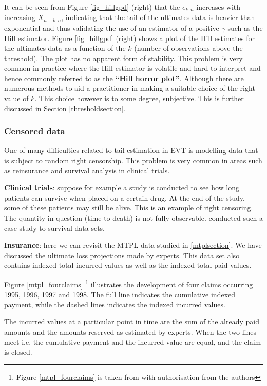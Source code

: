 It can be seen from Figure \ref{fig_hillgpd} (right) that the $e_{k,n}$ increases with increasing $X_{n-k,n}$, indicating that the tail of the ultimates data is heavier than exponential and thus validating the use of an estimator of a positive $\gamma$ such as the Hill estimator. Figure \ref{fig_hillgpd} (right) shows a plot of the Hill estimates for the ultimates data as a function of the $k$ (number of observations above the threshold). The plot has no apparent form of stability. This problem is very common in practice where the Hill estimator is volatile and hard to interpret and hence commonly referred to as the \textbf{``Hill horror plot''}. Although there are numerous methods to aid a practitioner in making a suitable choice of the right value of $k$. This choice however is to some degree, subjective. This is further discussed in Section {\ref{thresholdsection}}.

\subsubsection*{Censored data}
One of many difficulties related to tail estimation in EVT is modelling data that is subject to random right censorship. This problem is very common in areas such as reinsurance and survival analysis in clinical trials. 

\textbf{Clinical trials}: suppose for example a study is conducted to see how long patients can survive when placed on a certain drug. At the end of the study, some of these patients may still be alive. This is an example of right censoring. The quantity in question (time to death) is not fully observable. \cite{gomes2011estimation} conducted such a case study to survival data sets.

\textbf{Insurance}: here we can revisit the MTPL data studied in \autoref{mtplsection}. We have discussed the ultimate loss projections made by experts. This data set also contains indexed total incurred values as well as the indexed total paid values.

Figure \ref{mtpl_fourclaims} \footnote{Figure \ref{mtpl_fourclaims} is taken from \cite{albrecher2017reinsurance} with authorisation from the authors} illustrates the development of four claims occurring 1995, 1996, 1997 and 1998. The full line indicates the cumulative indexed payment, while the dashed lines indicates the indexed incurred values. 

The incurred values at a particular point in time are the sum of the already paid amounts and the amounts reserved as estimated by experts. When the two lines meet i.e. the cumulative payment and the incurred value are equal, and the claim is closed. 

